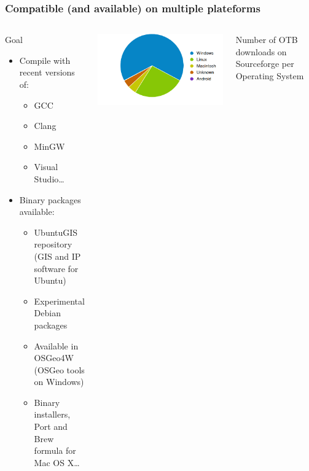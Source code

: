 \documentclass[8pt]{beamer}
\begin{document}
\begin{frame}
\frametitle{Compatible (and available) on multiple plateforms}
\begin{columns}
\begin{block}{Goal}
\begin{itemize}
\item Compile with recent versions of:
\begin{itemize}
\item GCC
\item Clang
\item MinGW
\item Visual Studio\ldots
\end{itemize}
\item Binary packages available:
\begin{itemize}
\item UbuntuGIS repository (GIS and IP software for Ubuntu)
\item Experimental Debian packages
\item Available in  OSGeo4W (OSGeo tools on Windows)
\item Binary installers, Port and Brew formula for Mac OS X\ldots
\end{itemize}
\end{itemize}
\end{block}
\includegraphics[width=\textwidth]{images/OTB4_download_sourceforge_os_crop.png}
\begin{center}
\tiny{Number of OTB downloads on Sourceforge per Operating System}
\end{center}
\end{columns}
\end{frame}
\end{document}
